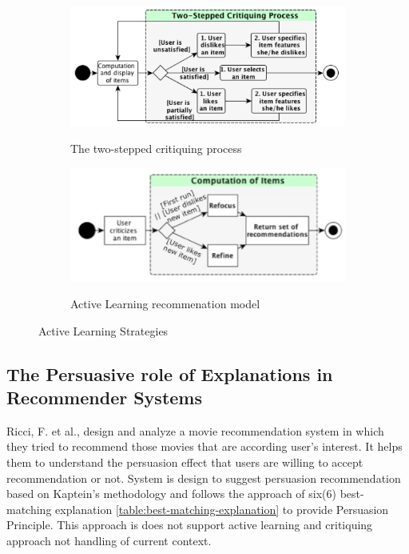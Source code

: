 \begin{figure}[h]
	\begin{subfigure}{.49\textwidth}
	\includegraphics[width=.9\linewidth]{figures/ch2_lamche2014active_1.png}
	\caption{The two-stepped critiquing process}
	\cite{lamche2014active}
	\label{fig:ch2_lamche2014active_1}
	\end{subfigure}
	\begin{subfigure}{.49\textwidth}
	\includegraphics[width=.9\linewidth]{figures/ch2_lamche2014active_2.png}
	\caption{Active Learning recommenation model}
	\cite{lamche2014active}
	\label{fig:ch2_lamche2014active_2}
	\end{subfigure}
	\caption{Active Learning Strategies}
	\label{fig:lamche2014active}
\end{figure}

\subsection{The Persuasive role of Explanations in Recommender Systems}

Ricci, F. et al.,\cite{gkika2014persuasive} design and analyze a movie recommendation system in which they tried to recommend those movies that are according user’s interest. It helps them to understand the persuasion effect that users are willing to accept recommendation or not. System is design to suggest persuasion recommendation based on Kaptein’s \cite{kaptein2012adaptive} methodology and follows the approach of six(6) best-matching explanation \ref{table:best-matching-explanation} to provide Persuasion Principle. This approach is does not support active learning and critiquing approach not handling of current context.\newline


